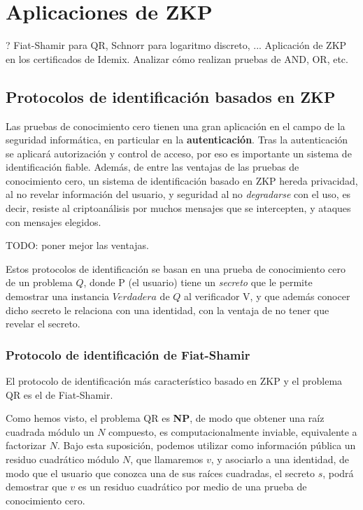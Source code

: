 \chapter{Aplicaciones de ZKP}\label{ch:aplicaciones} 

?
Fiat-Shamir para QR, Schnorr para logaritmo discreto, ...
Aplicación de ZKP en los certificados de Idemix. Analizar cómo realizan pruebas de AND, OR, etc.

\section{Protocolos de identificación basados en ZKP}


Las pruebas de conocimiento cero tienen una gran aplicación en el campo de la seguridad informática, en particular en la \textbf{autenticación}. Tras la autenticación se aplicará autorización y control de acceso, por eso es importante un sistema de identificación fiable. Además, de entre las ventajas de las pruebas de conocimiento cero, un sistema de identificación basado en ZKP hereda privacidad, al no revelar información del usuario, y seguridad al no \textit{degradarse} con el uso, es decir, resiste al criptoanálisis por muchos mensajes que se intercepten, y ataques con mensajes elegidos. 

TODO: poner mejor las ventajas.

Estos protocolos de identificación se basan en una prueba de conocimiento cero de un problema $Q$, donde P (el usuario) tiene un \textit{secreto} que le permite demostrar una instancia $Verdadera$ de $Q$ al verificador V, y que además conocer dicho secreto le relaciona con una identidad, con la ventaja de no tener que revelar el secreto.


\subsection{Protocolo de identificación de Fiat-Shamir}

El protocolo  de identificación más característico basado en ZKP y el problema QR es el de Fiat-Shamir.

Como hemos visto, el problema QR es \textbf{NP}, de modo que obtener una raíz cuadrada módulo un $N$ compuesto, es computacionalmente inviable, equivalente a factorizar $N$. Bajo esta suposición, podemos utilizar como información pública un residuo cuadrático módulo $N$, que llamaremos $v$, y asociarlo a una identidad, de modo que el usuario que conozca una de sus raíces cuadradas, el secreto $s$, podrá demostrar que $v$ es un residuo cuadrático por medio de una prueba de conocimiento cero.



